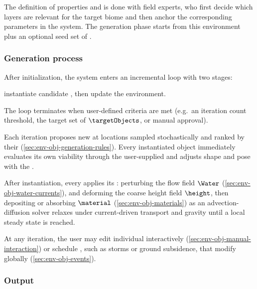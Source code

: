 The definition of  properties and  is done with field experts, who first decide which  layers are relevant for the target biome and then anchor the corresponding parameters in the system.
The generation phase starts from this environment plus an optional seed set of .

\subsubsection{Generation process}

After initialization, the system enters an incremental loop with two stages:
\begin{Itemize}
    \Item{} instantiate candidate , then
    \Item{} update the environment.
\end{Itemize}
The loop terminates when user-defined criteria are met (e.g.\ an iteration count threshold, the target set of  $\targetObjects$, or manual approval).


Each iteration proposes new  at locations sampled stochastically and ranked by their  (\cref{sec:env-obj-generation-rules}).
Every instantiated object immediately evaluates its own viability through the user-supplied  and adjusts shape and pose with the .


After instantiation, every  applies its : perturbing the flow field $\Water$ (\cref{sec:env-obj-water-currents}), and deforming the coarse height field $\height$, then depositing or absorbing  $\material$ (\cref{sec:env-obj-materials}) as an advection-diffusion solver relaxes  under current-driven transport and gravity until a local steady state is reached.

At any iteration, the user may edit individual  interactively (\cref{sec:env-obj-manual-interaction}) or schedule , such as storms or ground subsidence, that modify  globally (\cref{sec:env-obj-events}).

\subsubsection{Output}

